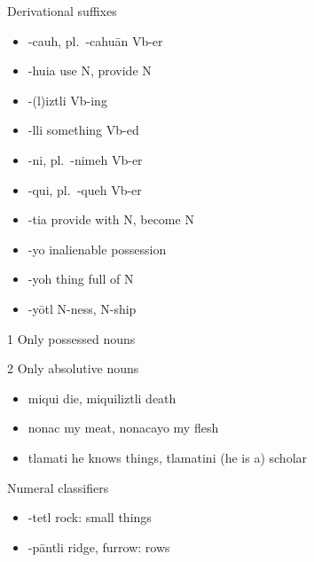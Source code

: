 \documentclass[12pt]{beamer}
\newcommand{\nah}[1]{\textcolor{nahgrn}{#1}}
\newcommand{\trs}[1]{\textcolor{nahblu}{#1}}
\begin{document}
\begin{frame}
\begin{columns}[t]
    \begin{column}{.20\linewidth}
      \begin{block}{Derivational suffixes}
        \begin{threeparttable}
          \begin{itemize}
            \item \nah{-cauh}, pl.~\nah{-cahuān}  \trs{Vb-er}
            \item \nah{-huia} \trs{use N, provide N}
            \item \nah{-(l)iztli} \trs{Vb-ing}
            \item \nah{-lli} \trs{something Vb-ed}
            \item \nah{-ni}, pl.~\nah{-nimeh}  \trs{Vb-er}
            \item \nah{-qui}, pl.~\nah{-queh}  \trs{Vb-er}
            \item \nah{-tia} \trs{provide with N, become N}
            \item \nah{-yo} inalienable possession
            \item \nah{-yoh} \trs{thing full of N}
            \item \nah{-yōtl} \trs{N-ness, N-ship}
          \end{itemize}
          \begin{tablenotes}
            \item[1] Only possessed nouns
            \item[2] Only absolutive nouns
          \end{tablenotes}
        \end{threeparttable}
      \end{block}
      \begin{example}
        \begin{itemize}
          \item \nah{miqui} \trs{die}, \nah{miquiliztli} \trs{death}
          \item \nah{nonac} \trs{my meat}, \nah{nonacayo} \trs{my flesh}
          \item \nah{tlamati} \trs{he knows things}, \nah{tlamatini} \trs{(he is a) scholar}
        \end{itemize}
      \end{example}
      \begin{block}{Numeral classifiers}
        \begin{itemize}
          \item \nah{-tetl} \trs{rock}: small things
          \item \nah{-pāntli} \trs{ridge, furrow}: rows

\end{itemize}
\end{block}
\end{column}
\end{columns}
\end{frame}
\end{document}
